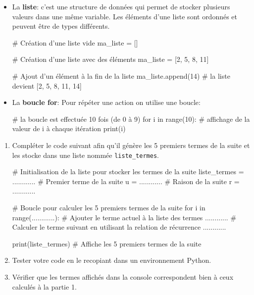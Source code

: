 \documentclass[11pt, a4paper]{report}
\begin{document}
\begin{easybox}
 
\begin{itemize}
    \item La \textbf{liste}: c'est une structure de données qui permet de stocker plusieurs valeurs dans une même variable. Les éléments d'une liste sont ordonnés et peuvent être de types différents.

    \begin{CodePythontexAlt}[TaillePolice = \large, Largeur=16cm,Centre,PremLigne=1]{}
# Création d'une liste vide
ma_liste = []

# Création d'une liste avec des éléments
ma_liste = [2, 5, 8, 11]

# Ajout d'un élément à la fin de la liste
ma_liste.append(14)
# la liste devient [2, 5, 8, 11, 14]


    \end{CodePythontexAlt}


    \medskip

    \item La \textbf{boucle for}: Pour répéter une action on utilise une boucle:
    \begin{CodePythontexAlt}[TaillePolice = \large, Largeur=16cm,Centre,PremLigne=1]{}
# la boucle est effectuée 10 fois (de 0 à 9)
for i in range(10):
    # affichage de la valeur de i à chaque itération
    print(i)    

\end{CodePythontexAlt}

\end{itemize}


\end{easybox}

\pagebreak


\begin{enumerate}
    \item Compléter le code suivant afin qu'il génère les 5 premiers termes de la suite et les stocke dans une liste nommée \verb|liste_termes|.
    

    \begin{CodePythontexAlt}[TaillePolice = \large, Largeur=17cm,Centre,PremLigne=1]{}
# Initialisation de la liste pour stocker les termes de la suite
liste_termes = ............
# Premier terme de la suite
u = ............
# Raison de la suite
r = ............

# Boucle pour calculer les 5 premiers termes de la suite
for i in range(............):
    # Ajouter le terme actuel à la liste des termes
    ............
    # Calculer le terme suivant en utilisant la relation de récurrence
    ............

print(liste_termes)  # Affiche les 5 premiers termes de la suite
    \end{CodePythontexAlt}
    
    \medskip

    \item Tester votre code en le recopiant dans un environnement Python.


\item Vérifier que les termes affichés dans la console correspondent bien à ceux calculés à la partie 1.
\end{enumerate}
\end{document}
